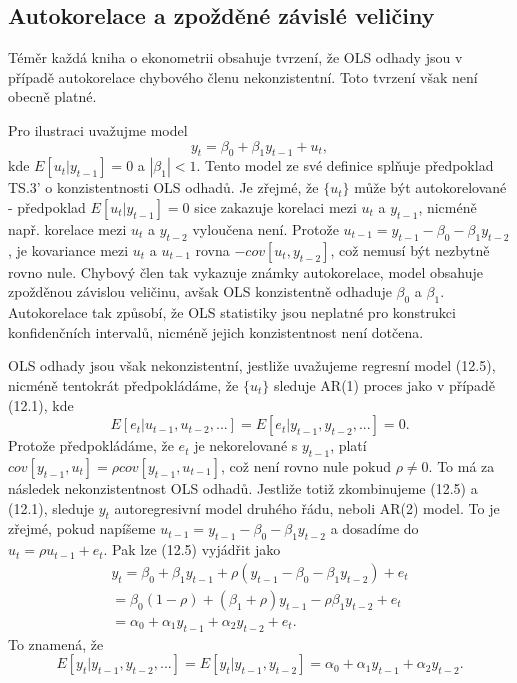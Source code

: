 \subsection{Autokorelace a zpožděné závislé veličiny}

Téměr každá kniha o ekonometrii obsahuje tvrzení, že OLS odhady jsou v případě autokorelace chybového členu nekonzistentní. Toto tvrzení však není obecně platné.

Pro ilustraci uvažujme model
\begin{equation}
y_t = \beta_0 + \beta_1 y_{t - 1} + u_t,
\end{equation}
kde $E[u_t | y_{t - 1}] = 0$ a $|\beta_1| < 1$. Tento model ze své definice splňuje předpoklad TS.3' o konzistentnosti OLS odhadů. Je zřejmé, že $\{u_t\}$ může být autokorelované - předpoklad $E[u_t | y_{t - 1}] = 0$ sice zakazuje korelaci mezi $u_t$ a $y_{t - 1}$, nicméně např. korelace mezi $u_t$ a $y_{t - 2}$ vyloučena není. Protože $u_{t - 1} = y_{t - 1} - \beta_0 - \beta_1 y_{t - 2}$, je kovariance mezi $u_t$ a $u_{t - 1}$ rovna $-cov[u_t, y_{t - 2}]$, což nemusí být nezbytně rovno nule. Chybový člen tak vykazuje známky autokorelace, model obsahuje zpožděnou závislou veličinu, avšak OLS konzistentně odhaduje $\beta_0$ a $\beta_1$. Autokorelace tak způsobí, že OLS statistiky jsou neplatné pro konstrukci konfidenčních intervalů, nicméně jejich konzistentnost není dotčena.

OLS odhady jsou však nekonzistentní, jestliže uvažujeme regresní model (12.5), nicméně tentokrát předpokládáme, že $\{u_t\}$ sleduje AR(1) proces jako v případě (12.1), kde
\begin{equation}
E[e_t | u_{t - 1}, u_{t - 2}, ...] = E[e_t | y_{t - 1}, y_{t - 2}, ...] = 0.
\end{equation}
Protože předpokládáme, že $e_t$ je nekorelované s $y_{t - 1}$, platí $cov[y_{t - 1}, u_t] = \rho cov[y_{t - 1}, u_{t - 1}]$, což není rovno nule pokud $\rho \ne 0$. To má za následek nekonzistentnost OLS odhadů. Jestliže totiž zkombinujeme (12.5) a (12.1), sleduje $y_t$ autoregresivní model druhého řádu, neboli AR(2) model. To je zřejmé, pokud napíšeme $u_{t - 1} = y_{t - 1} - \beta_0 - \beta_1 y_{t - 2}$ a dosadíme do $u_t = \rho u_{t - 1} + e_t$. Pak lze (12.5) vyjádřit jako
\begin{multline}
y_t = \beta_0 + \beta_1 y_{t - 1} + \rho (y_{t - 1} - \beta_0 - \beta_1 y_{t - 2}) + e_t\\
= \beta_0(1 - \rho) + (\beta_1 + \rho) y_{t - 1} - \rho \beta_1 y_{t - 2} + e_t\\
= \alpha_0 + \alpha_1 y_{t - 1} + \alpha_2 y_{t - 2} + e_t.
\end{multline}
To znamená, že
\begin{equation}
E[y_t | y_{t - 1}, y_{t - 2}, ...] = E[y_t | y_{t - 1}, y_{t - 2}] = \alpha_0 + \alpha_1 y_{t - 1} + \alpha_2 y_{t - 2}.
\end{equation}

